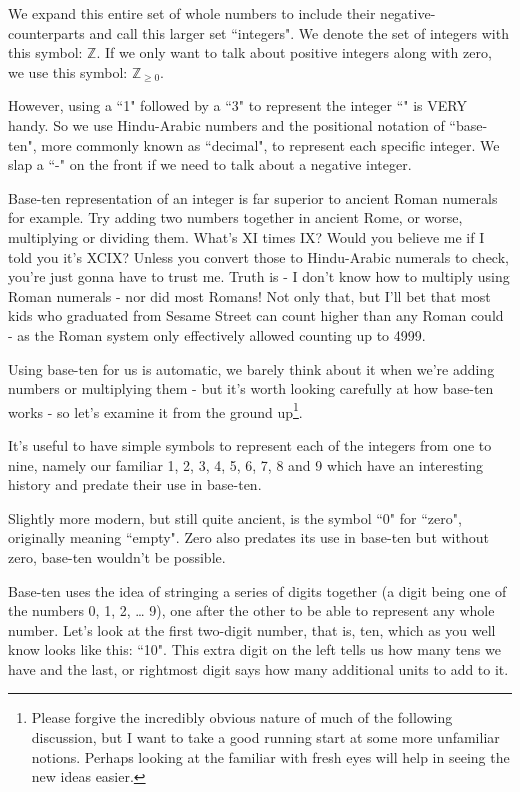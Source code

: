 \documentclass{article}
\begin{document}
We expand this entire set of whole numbers to include their
negative-counterparts and call this larger set ``integers".
We denote the set of integers with this symbol: $\mathbb{Z}$.
If we only want to talk about positive integers along with zero,
we use this symbol: $\mathbb{Z}_{\ge 0}$.

However, using a ``1" followed by a ``3" to represent the integer
``\faApple{}\faApple{}\faApple{}\faApple{}\faApple{}\faApple{}\faApple{}\faApple{}\faApple{}\faApple{}\faApple{}\faApple{}\faApple{}"
is VERY handy. So we use Hindu-Arabic numbers and the positional notation of ``base-ten",
more commonly known as ``decimal", to represent each specific integer.
We slap a ``-" on the front if we need to talk about a negative integer.

Base-ten representation of an integer is far superior to ancient Roman numerals for example.
Try adding two numbers together in ancient Rome, or worse,
multiplying or dividing them.
What's XI times IX? Would you believe me if I told
you it's XCIX? Unless you convert those to Hindu-Arabic numerals to check,
you're just gonna have to trust me.
Truth is - I don't know how to multiply using Roman
numerals - nor did most Romans! Not only that,
but I'll bet that most kids who graduated from Sesame Street
can count higher than any Roman could - as the
Roman system only effectively allowed counting up to 4999.

Using base-ten for us is automatic,
we barely think about it when we're adding numbers or multiplying
them - but it's worth looking carefully at how base-ten
works - so let's examine it from the ground up\footnote{Please forgive the incredibly obvious nature of much
of the following discussion, but I want to take a good running start
at some more unfamiliar notions. Perhaps looking at the familiar with fresh eyes will help in seeing the new ideas easier.}.

It's useful to have simple symbols to represent each of the integers from one to nine,
namely our familiar 1, 2, 3, 4, 5, 6, 7, 8 and 9
which have an interesting history and predate their use in base-ten.

Slightly more modern, but still quite ancient,
is the symbol ``0" for ``zero", originally meaning ``empty".
Zero also predates its use in base-ten but without zero,
base-ten wouldn't be possible.

Base-ten uses the idea of stringing a series of digits together
(a digit being one of the numbers 0, 1, 2, \dots{} 9),
one after the other to be able to represent any whole number.
Let's look at the first two-digit number, that is, ten,
which as you well know looks like this: ``10".
This extra digit on the left tells us how many tens we have and the last,
or rightmost digit says how many additional units to add to it.
\end{document}
